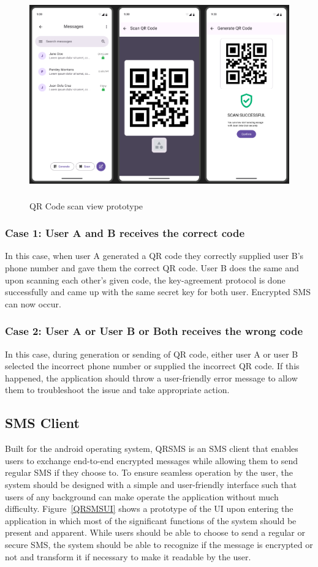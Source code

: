 \documentclass[journal]{./IEEE/IEEEtran}
\begin{document}
\begin{figure}
	\centering
	\includegraphics[height=3.5in]{./images/Scan_QR_prototype.png}
	\caption{QR Code scan view prototype}
	\label{scan_view}
\end{figure}

\subsubsection{Case 1: User A and B receives the correct code}
In this case, when user A generated a QR code they correctly supplied user B's
phone number and gave them the correct QR code. User B does the same and upon
scanning each other's given code, the key-agreement protocol is done successfully
and came up with the same secret key for both user. Encrypted SMS can now
occur.

\subsubsection{Case 2: User A or User B or Both receives the wrong code}
In this case, during generation or sending of QR code, either user A or
user B selected the incorrect phone number or supplied the incorrect QR code.
If this happened, the application should throw a user-friendly error message
to allow them to troubleshoot the issue and take appropriate action.

\subsection{SMS Client}
Built for the android operating system, QRSMS is an SMS client that enables
users to exchange end-to-end encrypted messages while allowing them to
send regular SMS if they choose to. To ensure seamless operation by the
user, the system should be designed with a simple and user-friendly interface
such that users of any background can make operate the application without
much difficulty. Figure~\ref{QRSMSUI} shows a prototype of the UI upon entering
the application in which most of the significant functions
of the system should be present and apparent. While users should be able to
choose to send a regular or secure SMS, the system should be able to recognize
if the message is encrypted or not and transform it if necessary to make it
readable by the user.
\end{document}
